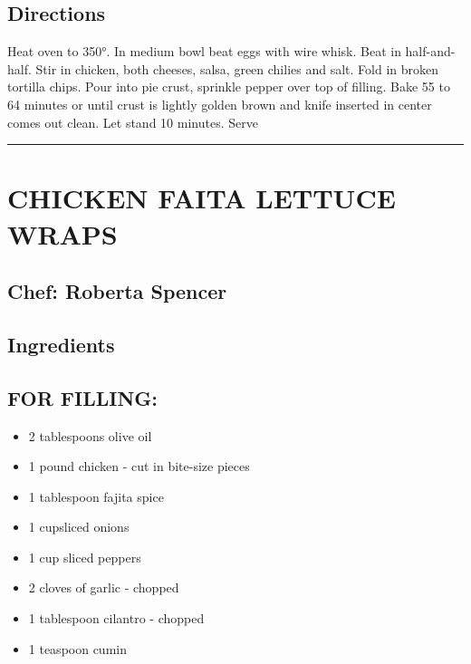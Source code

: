 \documentclass[
]{book}
\providecommand{\tightlist}{%
  \setlength{\itemsep}{0pt}\setlength{\parskip}{0pt}}
\begin{document}
\hypertarget{directions-48}{%
\subsection*{Directions}\label{directions-48}}


Heat oven to 350°. In medium bowl beat eggs with wire whisk. Beat in half-and-half. Stir in chicken, both cheeses, salsa, green chilies and salt. Fold in broken tortilla chips. Pour into pie crust, sprinkle pepper over top of filling. Bake 55 to 64 minutes or until crust is lightly golden brown and knife inserted in center comes out clean. Let stand 10 minutes. Serve

\begin{center}\rule{0.5\linewidth}{0.5pt}\end{center}

\hypertarget{chicken-faita-lettuce-wraps}{%
\section*{CHICKEN FAITA LETTUCE WRAPS}\label{chicken-faita-lettuce-wraps}}


\hypertarget{chef-roberta-spencer-17}{%
\subsection*{Chef: Roberta Spencer}\label{chef-roberta-spencer-17}}


\hypertarget{ingredients-49}{%
\subsection*{Ingredients}\label{ingredients-49}}


\hypertarget{for-filling}{%
\subsection*{FOR FILLING:}\label{for-filling}}


\begin{itemize}
\tightlist
\item
  2 tablespoons olive oil
\item
  1 pound chicken - cut in bite-size pieces
\item
  1 tablespoon fajita spice
\item
  1 cupsliced onions
\item
  1 cup sliced peppers
\item
  2 cloves of garlic - chopped
\item
  1 tablespoon cilantro - chopped
\item
  1 teaspoon cumin
\end{itemize}
\end{document}
